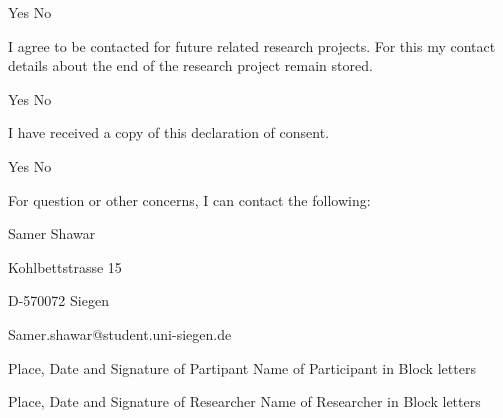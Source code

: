 	Yes
	No



I agree to be contacted for future related research projects. For this my contact details about the end of the research project remain stored.


	Yes
	No


I have received a copy of this declaration of consent.


	Yes
    No




For question or other concerns, I can contact the following: 


Samer Shawar


Kohlbettstrasse 15


D-570072 Siegen


Samer.shawar@student.uni-siegen.de



Place, Date and Signature of Partipant		Name of Participant in Block letters


Place, Date and Signature of Researcher		Name of Researcher in Block letters

